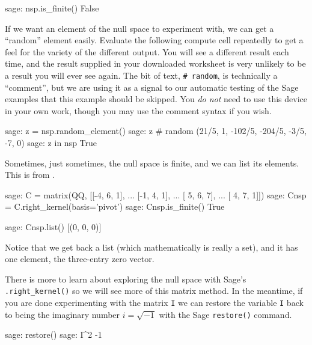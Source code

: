 \begin{sageexample}
sage: nsp.is_finite()
False
\end{sageexample}
%
If we want an element of the null space to experiment with, we can get a ``random'' element easily.  Evaluate the following compute cell repeatedly to get a feel for the variety of the different output.  You will see a different result each time, and the result supplied in your downloaded worksheet is very unlikely to be a result you will ever see again.  The bit of text, \verb!# random!, is technically a ``comment'', but we are using it as a signal to our automatic testing of the Sage examples that this example should be skipped.  You \emph{do not} need to use this device in your own work, though you may use the comment syntax if you wish.
%
\begin{sageexample}
sage: z = nsp.random_element()
sage: z                       # random
(21/5, 1, -102/5, -204/5, -3/5, -7, 0)
sage: z in nsp
True
\end{sageexample}
%
Sometimes, just sometimes, the null space is finite, and we can list its elements.  This is from .
%
\begin{sageexample}
sage: C = matrix(QQ, [[-4, 6, 1],
...                   [-1, 4, 1],
...                   [ 5, 6, 7],
...                   [ 4, 7, 1]])
sage: Cnsp = C.right_kernel(basis='pivot')
sage: Cnsp.is_finite()
True
\end{sageexample}
%
\begin{sageexample}
sage: Cnsp.list()
[(0, 0, 0)]
\end{sageexample}
%
Notice that we get back a list (which mathematically is really a set), and it has one element, the three-entry zero vector.\par
%
There is more to learn about exploring the null space with Sage's \verb?.right_kernel()? so we will see more of this matrix method.  In the meantime, if you are done experimenting with the matrix \verb?I? we can restore the variable \verb?I? back to being the imaginary number $i = \sqrt{-1}$ with the Sage \verb?restore()? command.
%
\begin{sageexample}
sage: restore()
sage: I^2
-1
\end{sageexample}
%
%
\begin{sageverbatim}
\end{sageverbatim}
%
